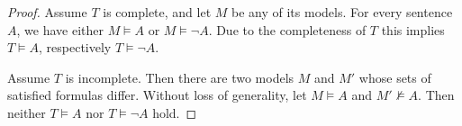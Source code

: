 \begin{proof}
Assume $T$ is complete, and let $M$ be any of its models.
For every sentence $A$, we have either $M \vDash A$ or $M \vDash \neg A$.
Due to the completeness of $T$ this implies $T \vDash A$, respectively $T \vDash \neg A$.

Assume $T$ is incomplete. Then there are two models $M$ and $M'$ whose sets of satisfied formulas differ.
Without loss of generality, let $M \vDash A$ and $M' \not\vDash A$.
Then neither $T \vDash A$ nor $T \vDash \neg A$ hold.
\end{proof}
